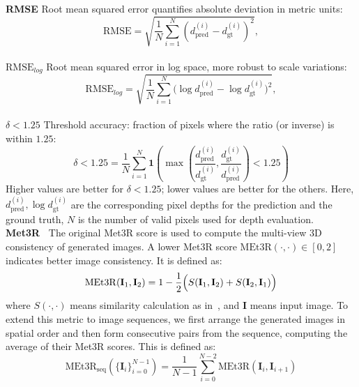 \noindent\textbf{RMSE} \quad Root mean squared error quantifies absolute deviation in metric units:
\begin{equation}
\text{RMSE} = \sqrt{\frac{1}{N}\sum_{i=1}^{N} (d_{\text{pred}}^{(i)} - d_{\text{gt}}^{(i)})^2},
\end{equation}
\\

\noindent\textbf{$\text{RMSE}_{log}$} \quad Root mean squared error in log space, more robust to scale variations:
\begin{equation}
\text{RMSE}_{log} = \sqrt{\frac{1}{N}\sum_{i=1}^{N} \bigl(\log d_{\text{pred}}^{(i)} - \log d_{\text{gt}}^{(i)}\bigr)^2},
\end{equation}
\\

\noindent\textbf{{$\delta < 1.25$}} \quad Threshold accuracy: fraction of pixels where the ratio (or inverse) is within $1.25$:
\begin{equation}
\delta < 1.25 = \frac{1}{N}\sum_{i=1}^{N} 
\mathbf{1}\left(
\max\left(\frac{d_{\text{pred}}^{(i)}}{d_{\text{gt}}^{(i)}}, \frac{d_{\text{gt}}^{(i)}}{d_{\text{pred}}^{(i)}}\right) < 1.25
\right)
\end{equation}
Higher values are better for $\delta < 1.25$; lower values are better for the others. Here, $d_{\text{pred}}^{(i)}, \log d_{\text{gt}}^{(i)}$ are the corresponding pixel depths for the prediction and the ground truth, $N$ is the number of valid pixels used for depth evaluation.
\\


\noindent\textbf{Met3R~\cite{asim25met3r}} \quad The original Met3R score is used to compute the multi-view 3D consistency of generated images. A lower Met3R score $ \mathrm{MEt3R}(\cdot, \cdot)\in[0,2]$ indicates better image consistency. It is defined as:
\begin{equation}
\mathrm{MEt3R}(\mathbf{I}_1, \mathbf{I}_2) = 1 - \frac{1}{2} \Bigl( S(\mathbf{I}_1, \mathbf{I}_2) + S(\mathbf{I}_2, \mathbf{I}_1) \Bigr)
\end{equation}
where $S(\cdot, \cdot)$ means similarity calculation as in~\cite{asim25met3r}, and $\mathbf{I}$ means input image.
To extend this metric to image sequences, we first arrange the generated images in spatial order and then form consecutive pairs from the sequence, computing the average of their Met3R scores. This is defined as:
\begin{equation}
\mathrm{MEt3R}_{\text{seq}} \left( \{\mathbf{I}_i\}_{i=0}^{N-1} \right)
= \frac{1}{N-1} \sum_{i=0}^{N-2} \mathrm{MEt3R}(\mathbf{I}_i, \mathbf{I}_{i+1})
\end{equation}






